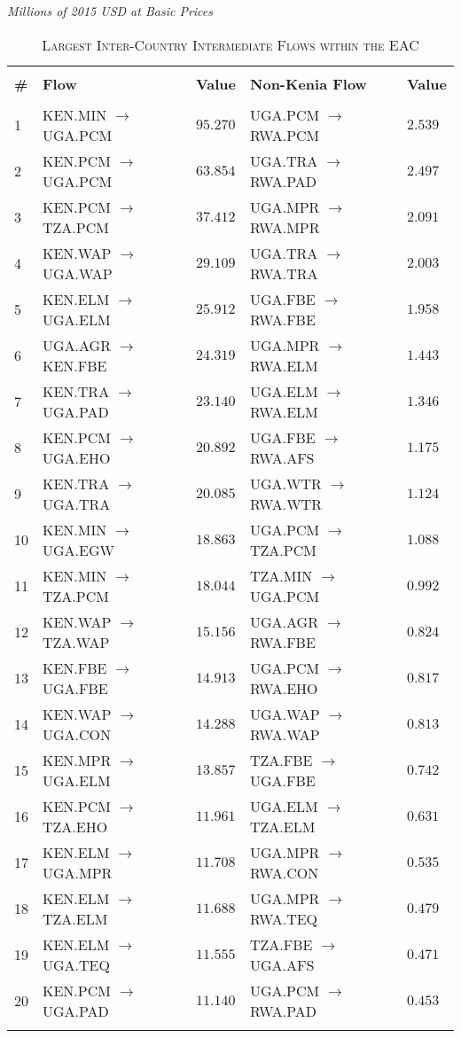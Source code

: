 \documentclass[a4paper]{article}
\begin{document}
\begin{table}[!htbp] \centering 
  \caption{\textsc{Largest Inter-Country Intermediate Flows within the EAC}} 
  \small{\textit{Millions of 2015 USD at Basic Prices}}
  \label{tab:eaclfl} 
\begin{tabular}{@{\extracolsep{5pt}} lllll} 
\\[-1.8ex]\hline 
\hline \\[-1.8ex] 
\textbf{\#} & \textbf{Flow} & \textbf{Value} & \textbf{Non-Kenia Flow} & \textbf{Value} \\ 
\hline \\[-1.8ex] 
1 & KEN.MIN $\to$ UGA.PCM & $95.270$ & UGA.PCM $\to$ RWA.PCM & $2.539$ \\ 
2 & KEN.PCM $\to$ UGA.PCM & $63.854$ & UGA.TRA $\to$ RWA.PAD & $2.497$ \\ 
3 & KEN.PCM $\to$ TZA.PCM & $37.412$ & UGA.MPR $\to$ RWA.MPR & $2.091$ \\ 
4 & KEN.WAP $\to$ UGA.WAP & $29.109$ & UGA.TRA $\to$ RWA.TRA & $2.003$ \\ 
5 & KEN.ELM $\to$ UGA.ELM & $25.912$ & UGA.FBE $\to$ RWA.FBE & $1.958$ \\ 
6 & UGA.AGR $\to$ KEN.FBE & $24.319$ & UGA.MPR $\to$ RWA.ELM & $1.443$ \\ 
7 & KEN.TRA $\to$ UGA.PAD & $23.140$ & UGA.ELM $\to$ RWA.ELM & $1.346$ \\ 
8 & KEN.PCM $\to$ UGA.EHO & $20.892$ & UGA.FBE $\to$ RWA.AFS & $1.175$ \\ 
9 & KEN.TRA $\to$ UGA.TRA & $20.085$ & UGA.WTR $\to$ RWA.WTR & $1.124$ \\ 
10 & KEN.MIN $\to$ UGA.EGW & $18.863$ & UGA.PCM $\to$ TZA.PCM & $1.088$ \\ 
11 & KEN.MIN $\to$ TZA.PCM & $18.044$ & TZA.MIN $\to$ UGA.PCM & $0.992$ \\ 
12 & KEN.WAP $\to$ TZA.WAP & $15.156$ & UGA.AGR $\to$ RWA.FBE & $0.824$ \\ 
13 & KEN.FBE $\to$ UGA.FBE & $14.913$ & UGA.PCM $\to$ RWA.EHO & $0.817$ \\ 
14 & KEN.WAP $\to$ UGA.CON & $14.288$ & UGA.WAP $\to$ RWA.WAP & $0.813$ \\ 
15 & KEN.MPR $\to$ UGA.ELM & $13.857$ & TZA.FBE $\to$ UGA.FBE & $0.742$ \\ 
16 & KEN.PCM $\to$ TZA.EHO & $11.961$ & UGA.ELM $\to$ TZA.ELM & $0.631$ \\ 
17 & KEN.ELM $\to$ UGA.MPR & $11.708$ & UGA.MPR $\to$ RWA.CON & $0.535$ \\ 
18 & KEN.ELM $\to$ TZA.ELM & $11.688$ & UGA.MPR $\to$ RWA.TEQ & $0.479$ \\ 
19 & KEN.ELM $\to$ UGA.TEQ & $11.555$ & TZA.FBE $\to$ UGA.AFS & $0.471$ \\ 
20 & KEN.PCM $\to$ UGA.PAD & $11.140$ & UGA.PCM $\to$ RWA.PAD & $0.453$ \\ 
\hline \\[-1.8ex] 
\end{tabular} 
\end{table} 
\FloatBarrier
\end{document}
